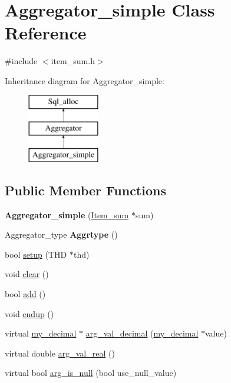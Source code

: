 \hypertarget{classAggregator__simple}{}\section{Aggregator\+\_\+simple Class Reference}
\label{classAggregator__simple}


{\ttfamily \#include $<$item\+\_\+sum.\+h$>$}

Inheritance diagram for Aggregator\+\_\+simple\+:\begin{figure}[H]
\begin{center}
\leavevmode
\includegraphics[height=3.000000cm]{classAggregator__simple}
\end{center}
\end{figure}
\subsection*{Public Member Functions}
\begin{DoxyCompactItemize}
\item 
\mbox{\label{classAggregator__simple_a4c8ec9df0208b3c69b92f1723d6d0569}} 
{\bfseries Aggregator\+\_\+simple} (\mbox{\hyperlink{classItem__sum}{Item\+\_\+sum}} $\ast$sum)
\item 
\mbox{\label{classAggregator__simple_a549b09ceb74fcd4de82d6284472c9cae}} 
Aggregator\+\_\+type {\bfseries Aggrtype} ()
\item 
bool \mbox{\hyperlink{classAggregator__simple_a5ba27dcd45b797485c888a36a5cc4bd3}{setup}} (T\+HD $\ast$thd)
\item 
void \mbox{\hyperlink{classAggregator__simple_a1bc4a3b483c68b07ac0c2472e868d1a2}{clear}} ()
\item 
bool \mbox{\hyperlink{classAggregator__simple_aa3b0160d86a60634bd390596bd524c7a}{add}} ()
\item 
void \mbox{\hyperlink{classAggregator__simple_a57c8435c2131160c58f8c1e6cce37542}{endup}} ()
\item 
virtual \mbox{\hyperlink{classmy__decimal}{my\+\_\+decimal}} $\ast$ \mbox{\hyperlink{classAggregator__simple_aeaf3d769df20c4c91476dd661da758f7}{arg\+\_\+val\+\_\+decimal}} (\mbox{\hyperlink{classmy__decimal}{my\+\_\+decimal}} $\ast$value)
\item 
virtual double \mbox{\hyperlink{classAggregator__simple_adaa482bd0ba91275f559a4eae95686c0}{arg\+\_\+val\+\_\+real}} ()
\item 
virtual bool \mbox{\hyperlink{classAggregator__simple_a89edab7b2334ef55dd1848094cdb4331}{arg\+\_\+is\+\_\+null}} (bool use\+\_\+null\+\_\+value)
\end{DoxyCompactItemize}
